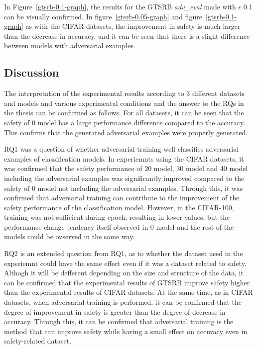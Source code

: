 \documentclass[journal,article,submit,moreauthors,pdftex]{Definitions/mdpi}
\begin{document}
In Figure~\ref{gtsrb-0.1-graph}, the results for the GTSRB {\it adv\_eval} made with \begin{math}\epsilon\end{math} 0.1 can be visually confirmed.
In figure~\ref{gtsrb-0.05-graph} and figure~\ref{gtsrb-0.1-graph} as with the CIFAR datasets, the improvement in safety is much larger than the decrease in accuracy, and it can be seen that there is a slight difference between models with adversarial examples.

\subsection{Discussion}


The interpretation of the experimental results according to 3 different datasets and models and various experimental conditions and the answer to the RQs in the thesis can be confirmed as follows.
For all datasets, it can be seen that the safety of 0 model has a large performance difference compared to the accuracy. This confirms that the generated adversarial examples were properly generated.

RQ1 was a question of whether adversarial training well classifies adversarial examples of classification models.
In experiemnts using the CIFAR datasets, it was confirmed that the safety performance of 20 model, 30 model and 40 model including the adversarial examples was significantly improved compared to the safety of 0 model not including the adversarial examples.
Through this, it was confirmed that adversarial training can contribute to the improvement of the safety performance of the classification model.
However, in the CIFAR-100, training was not sufficient during epoch, resulting in lower values, but the performance change tendency itself observed in 0 model and the rest of the models could be ovserved in the same way.

RQ2 is an extended question from RQ1, as to whether the dataset used in the experiemnt could have the same effect even if it was a dataset related to safety.
Althogh it will be defferent depending on the size and structure of the data, it can be confirmed that the experimental results of GTSRB improve safety higher than the experimental results of CIFAR datasets.
At the same time, as in CIFAR datasets, when adversarial training is performed, it can be confirmed that the degree of improvement in safety is greater than the degree of decrease in accuracy.
Through this, it can be confirmed that adversarial training is the method that can improve safety while having a small effect on accuracy even in safety-related dataset.
\end{document}
